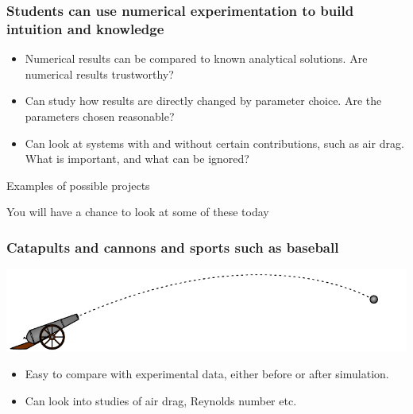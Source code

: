 \documentclass[english, 12pt]{beamer}
\begin{document}
\begin{frame}[fragile]
\frametitle{Students can use numerical experimentation to build intuition and knowledge}

\begin{itemize}
	\item Numerical results can be compared to known analytical solutions. Are numerical results trustworthy?
	\item Can study how results are directly changed by parameter choice. Are the parameters chosen reasonable?
	\item Can look at systems with and without certain contributions, such as air drag. \\ What is important, and what can be ignored?
\end{itemize}
\end{frame}

\begin{frame}
\begin{center}
{\Huge \color{DarkFern} Examples of possible projects}

You will have a chance to look at some of these today
\end{center}
\end{frame}

\begin{frame}[fragile]
\frametitle{Catapults and cannons and sports such as baseball}

\begin{center}
\includegraphics[width=\textwidth]{fig/cannonball}
\end{center}

\vspace{0.5cm}

\begin{itemize}
	\item Easy to compare with experimental data, either before or after simulation.
	\item Can look into studies of air drag, Reynolds number etc.
\end{itemize}
\end{frame}
\end{document}
